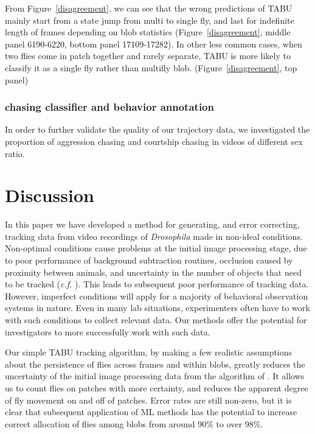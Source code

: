 \documentclass[11pt]{article}
\begin{document}
{From Figure~\ref{disagreement}, we can see that the wrong predictions of TABU mainly start from a state jump from multi to single fly, and last for indefinite length of frames depending on blob statistics (Figure~\ref{disagreement}, middle panel 6190-6220, bottom panel 17109-17282). In other less common cases, when two flies come in patch together and rarely separate, TABU is more likely to classify it as a single fly rather than multifly blob. (Figure~\ref{disagreement}, top panel)

\subsubsection*{chasing classifier and behavior annotation }
\vspace*{-0.15in}

In order to further validate the quality of our trajectory data, we investigated the proportion of aggression chasing and courtship chasing in videos of different sex ratio.  



\vspace*{-0.15in}
\section*{Discussion}\label{s:discuss}
\vspace*{-0.18in}

In this paper we have developed a method for generating, and error correcting, tracking data from video recordings of {\em Drosophila} made in non-ideal  conditions. Non-optimal conditions cause problems at the initial image processing stage, due to poor performance of background subtraction routines, occlusion caused by proximity between animals, and uncertainty in the number of objects that need to be tracked (\emph{c.f.} \cite{ctrax}). This leads to subsequent poor performance of tracking data. However, imperfect conditions will  apply for a majority of behavioral observation systems in nature. Even in many lab situations, experimenters often have to work with such conditions to collect relevant data. Our methods offer the potential for investigators to more successfully work with such data.

Our simple TABU tracking algorithm, by making a few realistic assumptions about the persistence of flies across frames and within blobs, greatly reduces the uncertainty of the initial image processing data from the algorithm of \cite{ArdekaniTavare:2013}. It allows us to count flies on patches with more certainty, and reduces the apparent degree of fly movement on and off of patches. Error rates are still non-zero, but it is clear that subsequent application of ML methods has the potential to increase correct allocation of flies among blobs from around 90\% to over 98\%. 

}
\end{document}
